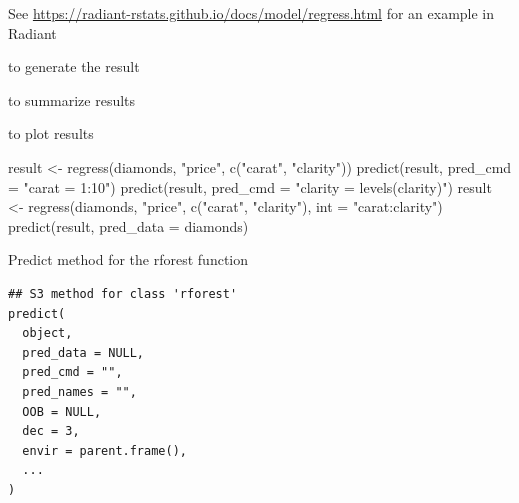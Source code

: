 \documentclass[a4paper]{book}
\begin{document}
%
\begin{Details}
See \url{https://radiant-rstats.github.io/docs/model/regress.html} for an example in Radiant
\end{Details}
%
\begin{SeeAlso}
 to generate the result

 to summarize results

 to plot results
\end{SeeAlso}
%
\begin{Examples}
\begin{ExampleCode}
result <- regress(diamonds, "price", c("carat", "clarity"))
predict(result, pred_cmd = "carat = 1:10")
predict(result, pred_cmd = "clarity = levels(clarity)")
result <- regress(diamonds, "price", c("carat", "clarity"), int = "carat:clarity")
predict(result, pred_data = diamonds) %

\end{ExampleCode}
\end{Examples}
%
\begin{Description}
Predict method for the rforest function
\end{Description}
%
\begin{Usage}
\begin{verbatim}
## S3 method for class 'rforest'
predict(
  object,
  pred_data = NULL,
  pred_cmd = "",
  pred_names = "",
  OOB = NULL,
  dec = 3,
  envir = parent.frame(),
  ...
)
\end{verbatim}
\end{Usage}
%
\end{document}
